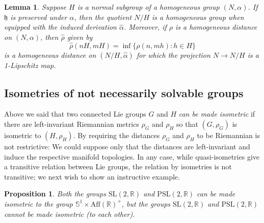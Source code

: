 \documentclass[a4paper,12pt]{amsart}
\newcommand{\pp}{\mathrm}
\theoremstyle{plain}
\theoremstyle{definition}
\theoremstyle{plain}
\newtheorem{prop}[maar]{Proposition}
\newtheorem{lemma}[maar]{Lemma}
\theoremstyle{remark}
\begin{document}
\begin{lemma} \label{huom:preserved-subalgebra-good-quotient}
Suppose \( H \) is a normal subgroup of a homogeneous group \( (N,\alpha) \). If \( \mathfrak{h} \) is preserved under \( \alpha \), then the quotient \( N/H \) is a homogeneous group when equipped with the induced derivation
\( \hat{\alpha} \).
Moreover, if \( \rho \) is a homogeneous distance on \( (N,\alpha) \), then \( \hat{\rho} \) given by
\begin{equation*}
\hat{\rho}(n H, m H) = \inf\{ \rho(n,mh) : h \in H \}
\end{equation*}
is a homogeneous distance on \( (N/H,\hat\alpha) \) for which the projection \( N \to N/H \) is a 1-Lipschitz map.
\end{lemma}









\subsection{Isometries of not necessarily solvable groups}

Above we said that two connected Lie groups \( G\) and \( H\) \emph{can be made isometric} if there are left-invariant Riemannian metrics \( \rho_G \) and \( \rho_H \)
so that \( (G,\rho_G) \) is isometric  to \( (H,\rho_H) \). 
By \cite[Proposition 2.4]{avain:KL17} 
requiring the distances \( \rho_G \) and \( \rho_H \) to be Riemannian is not restrictive: We could suppose only that the distances are left-invariant and induce the respective manifold topologies.
In any case, while quasi-isometries give a transitive relation between Lie groups, the relation by isometries is not transitive; we next wish to show an instructive example.

\begin{prop} \label{prop:CKLNO-selvennys}
	Both the groups \( \pp{SL}(2,\mathbb{R}) \) and \( \pp{PSL}(2,\mathbb{R}) \) can be made isometric to the group \( \mathbb{S}^1 \times \pp{Aff}(\mathbb{R})^+  \), but the groups \( \pp{SL}(2,\mathbb{R}) \) and \( \pp{PSL}(2,\mathbb{R}) \) cannot be made isometric (to each other).
\end{prop}
\end{document}

